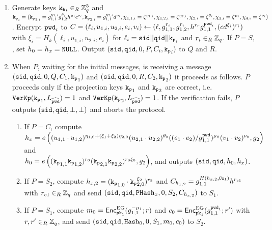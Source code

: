 	
	  \begin{enumerate}
	    \item Generate \TDSPHF keys $\mathtt{k_h}_i\in_R\mathbb{Z}_q^{5}$ and 
	      $\mathtt{k_p}_i=(\mathtt{k_p}_{1,i}=g_{1,1}^{\eta_{1,i}} g_{1,2}^{\theta_i} h^{\mu_i} c^{\nu_i}, \mathtt{k_p}_{2,i}=g_{1,1}^{\eta_{2,i}} d^{\nu_i}, \chi_{1,1,i}={\zeta}^{\eta_{1,i}}, \chi_{1,2,i}={\zeta}^{\eta_{2,i}}, \chi_{2,i}={\zeta}^{\theta_i}, \chi_{3,i}={\zeta}^{\mu_i}, \chi_{4,i}={\zeta}^{\nu_i})$. 
	    Encrypt $\mathtt{pwd}_i$ to $C=(\ell_i,u_{1,i},u_{2,i},e_i,v_i)\gets(\ell, g_{1,1}^{r_i}, g_{1,2}^{r_i}, h^{r_r} g_{1,1}^{\mathtt{pwd}_i}, (cd^{\xi_i})^{r_i})$ with $\xi_i=H_k(\ell_i, u_{1,i}, u_{2,i}, e_i)$ for $\ell_i=\mathtt{sid} || \mathtt{qid} || \mathtt{k_p}_i$ and $r_i\in_R\mathbb{Z}_q$.
	    If $P=S_1$, set $h_0=h_x=\mathtt{NULL}$.
	    Output $(\mathtt{sid},\mathtt{qid},0,P,C_i,\mathtt{k_p}_i)$ to $Q$ and $R$.
	    
	    \item When $P$, waiting for the initial messages, is receiving a message $(\mathtt{sid},\mathtt{qid},0,Q,C_1,\mathtt{k_p}_1)$ and $(\mathtt{sid},\mathtt{qid},0,R,C_2,\mathtt{k_p}_2)$ it proceeds as follows.
	      $P$ proceeds only if the projection keys $\mathtt{k_p}_1$ and $\mathtt{k_p}_2$ are correct, i.e. $\mathtt{VerKp}(\mathtt{k_p}_1, L_{\widehat{\mathtt{pwd}}})=1$ and $\mathtt{VerKp}(\mathtt{k_p}_2, L_{\widehat{\mathtt{pwd}}})=1$.
	          If the verification fails, $P$ outputs $(\mathtt{sid}, \mathtt{qid}, \bot, \bot)$ and aborts the protocol.
	      \begin{enumerate}
	        \item If $P=C$, compute \\
	          $ h_x=e\left((u_{1,1}\cdot u_{1,2})^{\eta_{1,0}+(\xi_1+\xi_2)\eta_{2,0}} (u_{2,1}\cdot u_{2,2})^{\theta_0} ((e_1\cdot e_2)/g_{1,1}^{\mathtt{pwd}})^{\mu_0} (v_1\cdot v_2)^{\nu_0}, g_2\right) $ and \\
	          $ h_0=e\left( (\mathtt{k_p}_{1,1}\mathtt{k_p}_{1,2})^{r_0} (\mathtt{k_p}_{2,1}\mathtt{k_p}_{2,2})^{r_0\xi_0}, g_2 \right)$,
	          and outputs $(\mathtt{sid}, \mathtt{qid}, h_0, h_x)$.\\
	        \item If $P=S_2$, compute
	          $h_{x,2} = (\mathtt{k_p}_{1,0} \cdot \mathtt{k_p}_{2,0}^{\xi_2})^{r_2}$ and 
	          $C_{h_{x,2}}=g_{1,1}^{H(h_{x,2}, \mathtt{Co}_{1})} h^{r_{c1}}$ with $r_{c1}\in_R\mathbb{Z}_q$
	          and send $(\mathtt{sid},\mathtt{qid},\mathtt{PHash}_x,0,S_2,C_{h_{x,2}})$ to $S_1$.
	        \item If $P=S_1$, compute
	          $m_{0} = \mathsf{Enc}_{\mathtt{pk}_1}^\mathrm{EG}(g_{1,1}^{-\mu_1}; r)$ and
	          $c_{0} = \mathsf{Enc}_{\mathtt{pk}_1}^\mathrm{EG}(g_{1,1}^{\mathtt{pwd}_1}; r')$
	          with $r,r'\in_R\mathbb{Z}_q$, and send $(\mathtt{sid},\mathtt{qid},\mathtt{Hash}_0,0,S_1,m_0,c_0)$ to $S_2$.
	      \end{enumerate}
	      

\end{enumerate}
